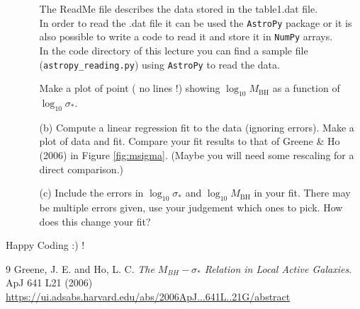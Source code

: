 \documentclass[11pt]{article}
\begin{document}
\begin{enumerate}
\begin{enumerate}
The ReadMe file describes the data stored in the table1.dat file. \\

In order to read the .dat file it can be used the {\tt AstroPy} package
or it is also possible to write a code to read it and store it in {\tt NumPy} arrays. \\

In the code directory of this lecture you can find a sample file ({\tt astropy\_reading.py}) using {\tt AstroPy} to read the data.

Make a plot of point ( no lines !) showing
$\log_\mathrm{10} M_\mathrm{BH}$ as a function of $\log_\mathrm{10}
\sigma_*$.

\item[(b)] Compute a linear regression fit 
to the data  (ignoring errors). Make a plot of data and fit. Compare your fit results to
that of Greene \& Ho (2006) in Figure \ref{fig:msigma}. (Maybe you will need some rescaling 
for a direct comparison.)

\item[(c)] Include the errors in $\log_\mathrm{10} \sigma_*$
  and $\log_\mathrm{10} M_\mathrm{BH}$ in your fit. There may be
  multiple errors given, use your judgement which ones to pick. How
  does this change your fit?
\end{enumerate}
\end{enumerate}
Happy Coding :) !
\begin{thebibliography} {9}
 Greene, J. E. and Ho, L. C. \textit{The $M_{BH} - \sigma_*$ Relation in Local Active Galaxies}. ApJ 641 L21 (2006) \url{https://ui.adsabs.harvard.edu/abs/2006ApJ...641L..21G/abstract}
\end{thebibliography}
\end{document}
